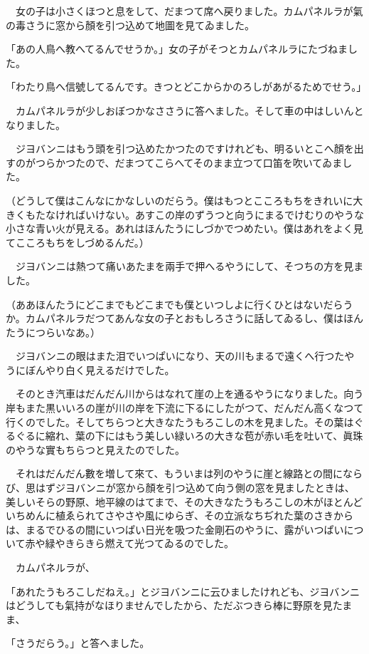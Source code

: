 \documentclass[tate,paper=b6j,jafontsize=9pt]{jlreq}
\begin{document}
　女の子は小さくほつと息をして、だまつて席へ戻りました。カムパネルラが氣の毒さうに窓から顏を引つ込めて地圖を見てゐました。

「あの人鳥へ教へてるんでせうか。」女の子がそつとカムパネルラにたづねました。

「わたり鳥へ信號してるんです。きつとどこからかのろしがあがるためでせう。」

　カムパネルラが少しおぼつかなささうに答へました。そして車の中はしいんとなりました。

　ジヨバンニはもう頭を引つ込めたかつたのですけれども、明るいとこへ顏を出すのがつらかつたので、だまつてこらへてそのまま立つて口笛を吹いてゐました。

（どうして僕はこんなにかなしいのだらう。僕はもつとこころもちをきれいに大きくもたなければいけない。あすこの岸のずうつと向うにまるでけむりのやうな小さな青い火が見える。あれはほんたうにしづかでつめたい。僕はあれをよく見てこころもちをしづめるんだ。）

　ジヨバンニは熱つて痛いあたまを兩手で押へるやうにして、そつちの方を見ました。

（ああほんたうにどこまでもどこまでも僕といつしよに行くひとはないだらうか。カムパネルラだつてあんな女の子とおもしろさうに話してゐるし、僕はほんたうにつらいなあ。）

　ジヨバンニの眼はまた泪でいつぱいになり、天の川もまるで遠くへ行つたやうにぼんやり白く見えるだけでした。

　そのとき汽車はだんだん川からはなれて崖の上を通るやうになりました。向う岸もまた黒いいろの崖が川の岸を下流に下るにしたがつて、だんだん高くなつて行くのでした。そしてちらつと大きなたうもろこしの木を見ました。その葉はぐるぐるに縮れ、葉の下にはもう美しい緑いろの大きな苞が赤い毛を吐いて、眞珠のやうな實もちらつと見えたのでした。

　それはだんだん數を増して來て、もういまは列のやうに崖と線路との間にならび、思はずジヨバンニが窓から顏を引つ込めて向う側の窓を見ましたときは、美しいそらの野原、地平線のはてまで、その大きなたうもろこしの木がほとんどいちめんに植ゑられてさやさや風にゆらぎ、その立派なちぢれた葉のさきからは、まるでひるの間にいつぱい日光を吸つた金剛石のやうに、露がいつぱいについて赤や緑やきらきら燃えて光つてゐるのでした。

　カムパネルラが、

「あれたうもろこしだねえ。」とジヨバンニに云ひましたけれども、ジヨバンニはどうしても氣持がなほりませんでしたから、ただぶつきら棒に野原を見たまま、

「さうだらう。」と答へました。
\end{document}
